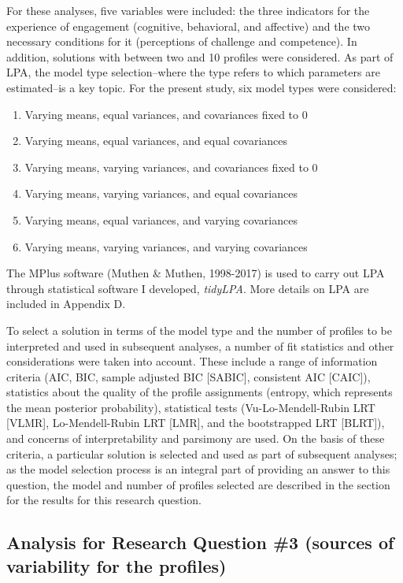 \documentclass[]{msu-thesis}
\providecommand{\tightlist}{%
  \setlength{\itemsep}{0pt}\setlength{\parskip}{0pt}}
\theoremstyle{definition}
\theoremstyle{definition}
\theoremstyle{definition}
\theoremstyle{remark}
\begin{document}
For these analyses, five variables were included: the three indicators
for the experience of engagement (cognitive, behavioral, and affective)
and the two necessary conditions for it (perceptions of challenge and
competence). In addition, solutions with between two and 10 profiles
were considered. As part of LPA, the model type selection--where the
type refers to which parameters are estimated--is a key topic. For the
present study, six model types were considered:

\begin{enumerate}
\def\labelenumi{\arabic{enumi}.}
\tightlist
\item
  Varying means, equal variances, and covariances fixed to 0
\item
  Varying means, equal variances, and equal covariances
\item
  Varying means, varying variances, and covariances fixed to 0
\item
  Varying means, varying variances, and equal covariances
\item
  Varying means, equal variances, and varying covariances
\item
  Varying means, varying variances, and varying covariances
\end{enumerate}

The MPlus software (Muthen \& Muthen, 1998-2017) is used to carry out
LPA through statistical software I developed, \emph{tidyLPA}. More
details on LPA are included in Appendix D.

To select a solution in terms of the model type and the number of
profiles to be interpreted and used in subsequent analyses, a number of
fit statistics and other considerations were taken into account. These
include a range of information criteria (AIC, BIC, sample adjusted BIC
{[}SABIC{]}, consistent AIC {[}CAIC{]}), statistics about the quality of
the profile assignments (entropy, which represents the mean posterior
probability), statistical tests (Vu-Lo-Mendell-Rubin LRT {[}VLMR{]},
Lo-Mendell-Rubin LRT {[}LMR{]}, and the bootstrapped LRT {[}BLRT{]}),
and concerns of interpretability and parsimony are used. On the basis of
these criteria, a particular solution is selected and used as part of
subsequent analyses; as the model selection process is an integral part
of providing an answer to this question, the model and number of
profiles selected are described in the section for the results for this
research question.

\subsection{Analysis for Research Question \#3 (sources of variability
for the
profiles)}\label{analysis-for-research-question-3-sources-of-variability-for-the-profiles}
\end{document}
